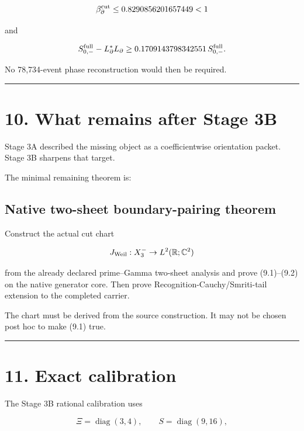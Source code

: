 \[
\beta_\partial^{\rm cut}
\le0.8290856201657449<1
\]

and

\[
S_{0,-}^{\rm full}-L_\partial^*L_\partial
\ge
0.1709143798342551\,S_{0,-}^{\rm full}.
\]

No 78,734-event phase reconstruction would then be required.

\begin{center}\rule{0.5\linewidth}{0.5pt}\end{center}

\hypertarget{what-remains-after-stage-3b}{%
\section{10. What remains after Stage 3B}\label{what-remains-after-stage-3b}}

Stage 3A described the missing object as a coefficientwise orientation packet.
Stage 3B sharpens that target.

The minimal remaining theorem is:

\hypertarget{native-two-sheet-boundary-pairing-theorem}{%
\subsection{Native two-sheet boundary-pairing theorem}\label{native-two-sheet-boundary-pairing-theorem}}

Construct the actual cut chart

\[
J_{\rm Weil}:X_3^-\to L^2(\mathbb R;\mathbb C^2)
\]

from the already declared prime--Gamma two-sheet analysis and prove (9.1)--(9.2)
on the native generator core. Then prove Recognition-Cauchy/Smriti-tail
extension to the completed carrier.

The chart must be derived from the source construction. It may not be chosen
post hoc to make (9.1) true.

\begin{center}\rule{0.5\linewidth}{0.5pt}\end{center}

\hypertarget{exact-calibration}{%
\section{11. Exact calibration}\label{exact-calibration}}

The Stage 3B rational calibration uses

\[
\Xi=\operatorname{diag}(3,4),
\qquad
S=\operatorname{diag}(9,16),
\]

